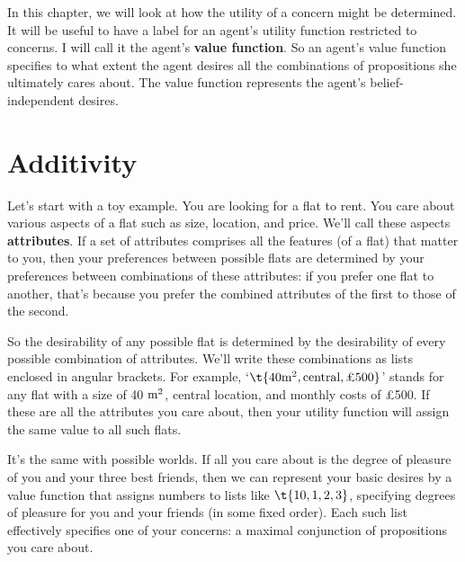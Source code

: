 In this chapter, we will look at how the utility of a concern might be
determined. It will be useful to have a label for an agent's utility
function restricted to concerns. I will call it the agent's
\textbf{value function}. So an agent's value function specifies to
what extent the agent desires all the combinations of propositions she
ultimately cares about. The value function represents the agent's
belief-independent desires. 

\section{Additivity}\label{sec:additivity}

Let's start with a toy example. You are looking for a flat to rent.
You care about various aspects of a flat such as size, location, and
price. We'll call these aspects \textbf{attributes}. If a set of
attributes comprises all the features (of a flat) that matter to you,
then your preferences between possible flats are determined by your
preferences between combinations of these attributes: if you prefer
one flat to another, that's because you prefer the combined attributes
of the first to those of the second.

So the desirability of any possible flat is determined by the
desirability of every possible combination of attributes. We'll write
these combinations as lists enclosed in angular brackets. For example,
`$\t{40 \m^2, \text{central}, \text{£500}}$' stands for any flat with
a size of 40 $\text{m}^2$, central location, and monthly costs of £500. If
these are all the attributes you care about, then your utility
function will assign the same value to all such flats.


It's the same with possible worlds. If all you care about is the
degree of pleasure of you and your three best friends, then we can
represent your basic desires by a value function that assigns numbers
to lists like $\t{10, 1, 2, 3}$, specifying degrees of pleasure for
you and your friends (in some fixed order). Each such list effectively
specifies one of your concerns: a maximal conjunction of propositions
you care about.

